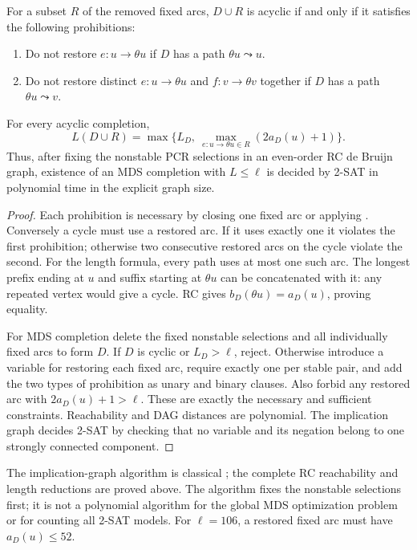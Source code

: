 \begin{theorem}
\label{thm:stable-completion}
For a subset $R$ of the removed fixed arcs, $D\cup R$ is acyclic
if and only if it satisfies the following prohibitions:
\begin{enumerate}
\item Do not restore $e:u\to\theta u$ if $D$ has a path
      $\theta u\leadsto u$.
\item Do not restore distinct $e:u\to\theta u$ and
      $f:v\to\theta v$ together if $D$ has a path
      $\theta u\leadsto v$.
\end{enumerate}
For every acyclic completion,
\begin{equation}
 L(D\cup R)=\max\{L_D,\ \max_{e:u\to\theta u\in R}(2a_D(u)+1)\}.
 \label{eq:stable-length}
\end{equation}
Thus, after fixing the nonstable PCR selections in an even-order
RC de Bruijn graph, existence of an MDS completion with $L\le\ell$
is decided by 2-SAT in polynomial time in the explicit graph size.
\end{theorem}
\begin{proof}
Each prohibition is necessary by closing one fixed arc or applying
. Conversely a cycle must use a restored
arc. If it uses exactly one it violates the first prohibition;
otherwise two consecutive restored arcs on the cycle violate the
second. For the length formula, every path uses at most one such
arc. The longest prefix ending at $u$ and suffix starting at
$\theta u$ can be concatenated with it: any repeated vertex would
give a cycle. RC gives $b_D(\theta u)=a_D(u)$, proving equality.

For MDS completion delete the fixed nonstable selections and all
individually fixed arcs to form $D$. If $D$ is cyclic or $L_D>\ell$,
reject. Otherwise introduce a variable for restoring each fixed
arc, require exactly one per stable pair, and add the two types of
prohibition as unary and binary clauses. Also forbid any restored
arc with $2a_D(u)+1>\ell$. These are exactly the necessary and
sufficient constraints. Reachability and DAG distances are polynomial.
The implication graph decides 2-SAT by checking that no variable
and its negation belong to one strongly connected component.
\end{proof}
The implication-graph algorithm is classical
\cite{AspvallPlassTarjan1979}; the complete RC reachability and
length reductions are proved above. The algorithm fixes the
nonstable selections first; it is not a polynomial algorithm for
the global MDS optimization problem or for counting all 2-SAT models.
For $\ell=106$, a restored fixed arc must have $a_D(u)\le52$.

